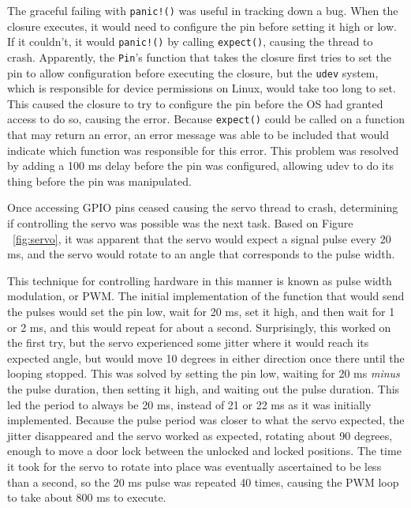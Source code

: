 \documentclass[a4paper]{article}
\begin{document}
The graceful failing with \texttt{panic!()} was useful in tracking down a bug.
When the closure executes, it would need to configure the pin before setting it high or low.
If it couldn't, it would \texttt{panic!()} by calling \texttt{expect()}, causing the thread to crash.
Apparently, the \texttt{Pin}'s function that takes the closure first tries to set the pin to allow configuration before executing the closure, but the \texttt{udev} system, which is responsible for device permissions on Linux, would take too long to set.
This caused the closure to try to configure the pin before the OS had granted access to do so, causing the error.
Because \texttt{expect()} could be called on a function that may return an error, an error message was able to be included that would indicate which function was responsible for this error.
This problem was resolved by adding a 100 ms delay before the pin was configured, allowing udev to do its thing before the pin was manipulated.


Once accessing GPIO pins ceased causing the servo thread to crash, determining if controlling the servo was possible was the next task.
Based on Figure ~\ref{fig:servo}, it was apparent that the servo would expect a signal pulse every 20 ms, and the servo would rotate to an angle that corresponds to the pulse width.



This technique for controlling hardware in this manner is known as pulse width modulation, or PWM.
The initial implementation of the function that would send the pulses would set the pin low, wait for 20 ms, set it high, and then wait for 1 or 2 ms, and this would repeat for about a second.
Surprisingly, this worked on the first try, but the servo experienced some jitter where it would reach its expected angle, but would move 10 degrees in either direction once there until the looping stopped.
This was solved by setting the pin low, waiting for 20 ms \emph{minus} the pulse duration, then setting it high, and waiting out the pulse duration.
This led the period to always be 20 ms, instead of 21 or 22 ms as it was initially implemented.
Because the pulse period was closer to what the servo expected, the jitter disappeared and the servo worked as expected, rotating about 90 degrees, enough to move a door lock between the unlocked and locked positions.
The time it took for the servo to rotate into place was eventually ascertained to be less than a second, so the 20 ms pulse was repeated 40 times, causing the PWM loop to take about 800 ms to execute.
\end{document}
